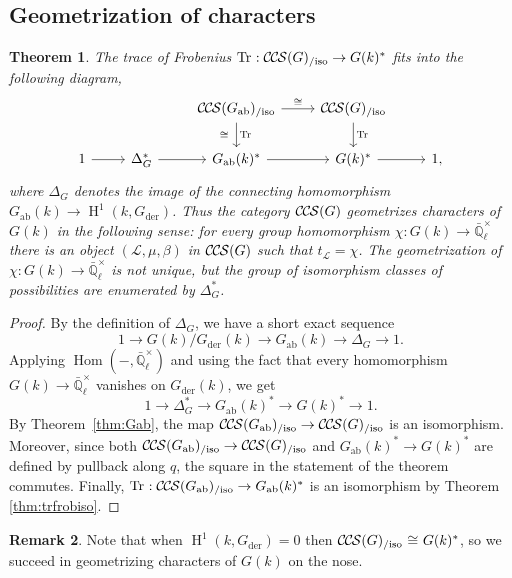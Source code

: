 \documentclass[10pt]{amsart}
\theoremstyle{plain}
\newtheorem{theorem}{Theorem}[section]
\theoremstyle{definition}
\newtheorem{remark}[theorem]{Remark}
\newcommand{\EE}{\mathbb{\bar Q}_\ell}
\newcommand{\Fq}{k}
\newcommand{\EEx}{\EE^\times}
\DeclareMathOperator{\Hom}{Hom}
\DeclareMathOperator{\Hh}{H}
\newcommand{\der}{_{\operatorname{der}}}
\newcommand{\ab}{_{\operatorname{ab}}}
\newcommand{\iso}{{\ \cong\ }}
\newcommand{\trFrob}[1]{t_{#1}}
\newcommand{\TrFrob}[1]{\operatorname{Tr}_{#1}}
\newcommand{\cs}[1]{{\mathcal{#1}}}
\newcommand{\CCS}{{\mathcal{C\hskip-.8pt C\hskip-0.8pt S}}}
\newcommand{\CCSiso}[1]{\CCS(#1)_{/\text{iso}}}
\begin{document}
\subsection{Geometrization of characters} \label{ssec:geo}

\begin{theorem}\label{thm:geo}
The trace of Frobenius $\TrFrob{} : \CCSiso{G}\to G(\Fq)^*$ fits into the following diagram,
\[
\begin{tikzcd}
\ & & \CCSiso{G\ab} \arrow{d}{\TrFrob{}}[swap]{\iso} \arrow{r}{\iso} & \CCSiso{G} \arrow{d}{\TrFrob{}}& \\
1 \arrow{r} & \Delta_G^* \arrow{r} & G\ab(k)^* \arrow{r} & G(k)^* \arrow{r} & 1,
\end{tikzcd}
\]
where $\Delta_G$ denotes the image of the connecting homomorphism $G\ab(\Fq) \to \Hh^1(\Fq, G\der)$. 
Thus the category $\CCS(G)$ geometrizes characters of $G(\Fq)$ in the following sense: for every group homomorphism $\chi : G(\Fq) \to \EEx$ there is an object $(\cs{L},\mu,\beta)$ in $\CCS(G)$ such that $\trFrob{\cs{L}} = \chi$. The geometrization of $\chi : G(\Fq) \to \EEx$ is not unique, but the group of isomorphism classes of possibilities are enumerated by $\Delta_G^*$.
\end{theorem}

\begin{proof}
By the definition of $\Delta_G$, we have a short exact sequence
\[
1 \to G(k) / G\der(k) \to G\ab(k) \to \Delta_G \to 1.
\]
Applying $\Hom(-, \EEx)$ and using the fact that every homomorphism $G(k) \to \EEx$ vanishes on $G\der(k)$, we get
\[
1 \to \Delta_G^* \to G\ab(k)^* \to G(k)^* \to 1.
\]
By Theorem~\ref{thm:Gab}, the map $\CCSiso{G\ab} \to \CCSiso{G}$ is an isomorphism.
Moreover, since both $\CCSiso{G\ab} \to \CCSiso{G}$ and $G\ab(k)^* \to G(k)^*$ are
defined by pullback along $q$, the square in the statement of the theorem commutes.
Finally, $\TrFrob{} : \CCSiso{G\ab} \to G\ab(k)^*$ is an isomorphism by Theorem \ref{thm:trfrobiso}.
\end{proof}

\begin{remark}
Note that when $\Hh^1(k,G\der) = 0$ then $\CCSiso{G} \iso G(\Fq)^*$, so
we succeed in geometrizing characters of $G(k)$ on the nose.
\end{remark}
\end{document}
